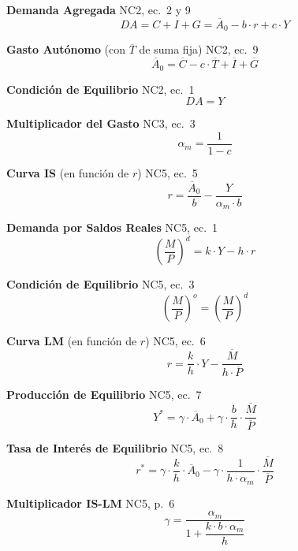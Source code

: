 \documentclass[11pt,a4paper]{article}
\newcommand{\barvar}[1]{\overline{#1}}
\begin{document}
\begin{formulabox}

\textbf{Demanda Agregada} \hfill \textcolor{grismedio}{\small NC2, ec.\ 2 y 9}
\[
    DA = C + I + G = \barvar{A}_0 - b \cdot r + c \cdot Y
\]

\textbf{Gasto Aut\'{o}nomo} (con $\barvar{T}$ de suma fija) \hfill \textcolor{grismedio}{\small NC2, ec.\ 9}
\[
    \barvar{A}_0 = \barvar{C} - c \cdot \barvar{T} + \barvar{I} + \barvar{G}
\]

\textbf{Condici\'{o}n de Equilibrio} \hfill \textcolor{grismedio}{\small NC2, ec.\ 1}
\[
    DA = Y
\]

\textbf{Multiplicador del Gasto} \hfill \textcolor{grismedio}{\small NC3, ec.\ 3}
\[
    \alpha_m = \frac{1}{1 - c}
\]

\textbf{Curva IS} (en funci\'{o}n de $r$) \hfill \textcolor{grismedio}{\small NC5, ec.\ 5}
\[
    r = \frac{\barvar{A}_0}{b} - \frac{Y}{\alpha_m \cdot b}
\]

\end{formulabox}

\vspace{0.4cm}

\begin{formulabox}

\textbf{Demanda por Saldos Reales} \hfill \textcolor{grismedio}{\small NC5, ec.\ 1}
\[
    \left(\frac{M}{P}\right)^d = k \cdot Y - h \cdot r
\]

\textbf{Condici\'{o}n de Equilibrio} \hfill \textcolor{grismedio}{\small NC5, ec.\ 3}
\[
    \left(\frac{M}{P}\right)^o = \left(\frac{M}{P}\right)^d
\]

\textbf{Curva LM} (en funci\'{o}n de $r$) \hfill \textcolor{grismedio}{\small NC5, ec.\ 6}
\[
    r = \frac{k}{h} \cdot Y - \frac{\barvar{M}}{h \cdot \barvar{P}}
\]

\end{formulabox}

\vspace{0.4cm}

\begin{formulabox}[Equilibrio IS-LM]

\textbf{Producci\'{o}n de Equilibrio} \hfill \textcolor{grismedio}{\small NC5, ec.\ 7}
\[
    Y^* = \gamma \cdot \barvar{A}_0 + \gamma \cdot \frac{b}{h} \cdot \frac{\barvar{M}}{\barvar{P}}
\]

\textbf{Tasa de Inter\'{e}s de Equilibrio} \hfill \textcolor{grismedio}{\small NC5, ec.\ 8}
\[
    r^* = \gamma \cdot \frac{k}{h} \cdot \barvar{A}_0 - \gamma \cdot \frac{1}{h \cdot \alpha_m} \cdot \frac{\barvar{M}}{\barvar{P}}
\]

\textbf{Multiplicador IS-LM} \hfill \textcolor{grismedio}{\small NC5, p.\ 6}
\[
    \gamma = \frac{\alpha_m}{1 + \dfrac{k \cdot b \cdot \alpha_m}{h}}
\]

\end{formulabox}
\end{document}
